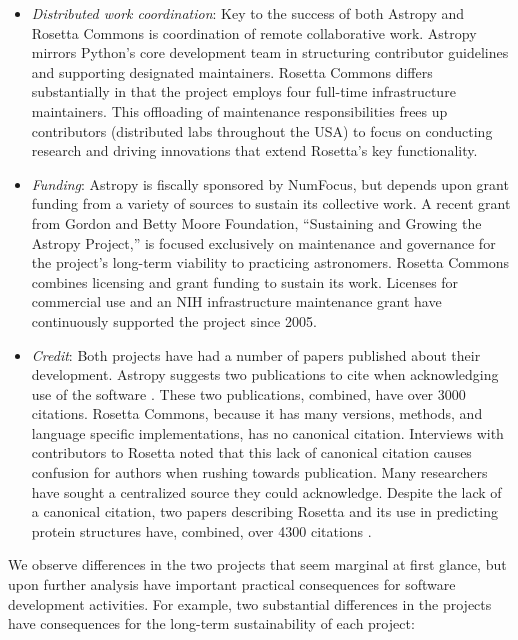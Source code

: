 \documentclass[
]{book}
\begin{document}
\begin{itemize}
\item
  \emph{Distributed work coordination}: Key to the success of both Astropy and Rosetta
  Commons is coordination of remote collaborative work. Astropy mirrors Python's
  core development team in structuring contributor guidelines and supporting
  designated maintainers. Rosetta Commons differs substantially in that the project
  employs four full-time infrastructure maintainers. This offloading of
  maintenance responsibilities frees up contributors (distributed labs throughout
  the USA) to focus on conducting research and driving innovations that extend
  Rosetta's key functionality.
\item
  \emph{Funding}: Astropy is fiscally sponsored by NumFocus, but depends upon grant
  funding from a variety of sources to sustain its collective work. A recent
  grant from Gordon and Betty Moore Foundation, ``Sustaining and Growing the
  Astropy Project,'' is focused exclusively on maintenance and governance for
  the project's long-term viability to practicing astronomers. Rosetta Commons
  combines licensing and grant funding to sustain its work. Licenses for
  commercial use and an NIH infrastructure maintenance grant have continuously
  supported the project since 2005.
\item
  \emph{Credit}: Both projects have had a number of papers published about their
  development. Astropy suggests two publications to cite when acknowledging
  use of the software \citep{robitaille2013astropy, price2018astropy}. These two
  publications, combined, have over 3000 citations. Rosetta Commons,
  because it has many versions, methods, and language specific implementations,
  has no canonical citation. Interviews with contributors to Rosetta noted
  that this lack of canonical citation causes confusion for authors when rushing towards publication.
  Many researchers have sought a centralized source they could acknowledge.
  Despite the lack of a canonical citation, two papers describing Rosetta and
  its use in predicting protein structures have, combined, over 4300
  citations \citep{rohl2004protein, salmena2011cerna}.
\end{itemize}

We observe differences in the two projects that seem marginal at first
glance, but upon further analysis have important practical consequences
for software development activities. For example, two substantial
differences in the projects have consequences for the long-term sustainability
of each project:
\end{document}
